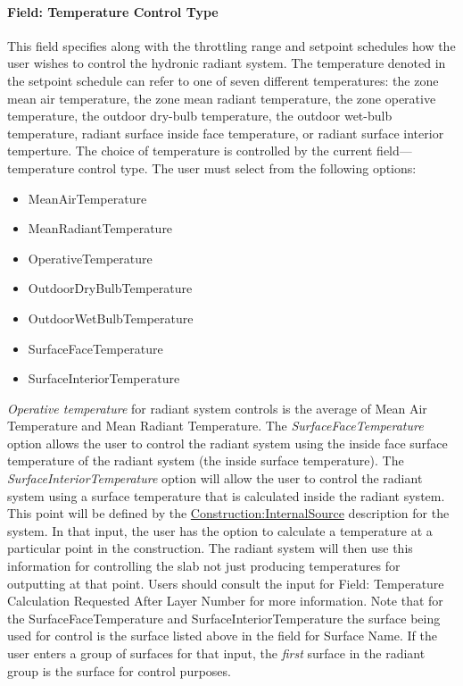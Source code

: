 \paragraph{Field: Temperature Control Type}\label{field-temperature-control-type}

This field specifies along with the throttling range and setpoint schedules how the user wishes to control the hydronic radiant system. The temperature denoted in the setpoint schedule can refer to one of seven different temperatures: the zone mean air temperature, the zone mean radiant temperature, the zone operative temperature, the outdoor dry-bulb temperature, the outdoor wet-bulb temperature, radiant surface inside face temperature, or radiant surface interior temperture. The choice of temperature is controlled by the current field---temperature control type. The user must select from the following options:

\begin{itemize}
\item
  MeanAirTemperature
\item
  MeanRadiantTemperature
\item
  OperativeTemperature
\item
  OutdoorDryBulbTemperature
\item
  OutdoorWetBulbTemperature
\item
  SurfaceFaceTemperature
\item
  SurfaceInteriorTemperature
\end{itemize}

\emph{Operative temperature} for radiant system controls is the average of Mean Air Temperature and Mean Radiant Temperature.  The \emph{SurfaceFaceTemperature} option allows the user to control the radiant system using the inside face surface temperature of the radiant system (the inside surface temperature).  The \emph{SurfaceInteriorTemperature} option will allow the user to control the radiant system using a surface temperature that is calculated inside the radiant system.  This point will be defined by the  \hyperref[constructioninternalsource]{Construction:InternalSource} description for the system.  In that input, the user has the option to calculate a temperature at a particular point in the construction.  The radiant system will then use this information for controlling the slab not just producing temperatures for outputting at that point.  Users should consult the input for Field: Temperature Calculation Requested After Layer Number for more information.  Note that for the SurfaceFaceTemperature and SurfaceInteriorTemperature the surface being used for control is the surface listed above in the field for Surface Name.  If the user enters a group of surfaces for that input, the \emph{first} surface in the radiant group is the surface for control purposes.

